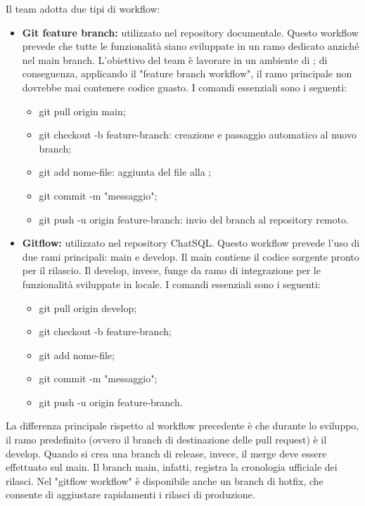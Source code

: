 \par Il team adotta due tipi di workflow:
\begin{itemize}
  \item \textbf{Git feature branch:} utilizzato nel repository documentale. Questo workflow prevede che tutte le funzionalità siano sviluppate in un ramo dedicato anziché nel main branch. L'obiettivo del team è lavorare in un ambiente di ; di conseguenza, applicando il "feature branch workflow", il ramo principale non dovrebbe mai contenere codice guasto. I comandi essenziali sono i seguenti:
  \begin{itemize}
    \item git pull origin main;
    \item git checkout -b feature-branch: creazione e passaggio automatico al nuovo branch;
    \item git add nome-file: aggiunta del file alla ;
    \item git commit -m "messaggio";
    \item git push -u origin feature-branch: invio del branch al repository remoto.
  \end{itemize}
  \item \textbf{Gitflow:} utilizzato nel repository ChatSQL. Questo workflow prevede l'uso di due rami principali: main e develop. Il main contiene il codice sorgente pronto per il rilascio. Il develop, invece, funge da ramo di integrazione per le funzionalità sviluppate in locale. I comandi essenziali sono i seguenti:
  \begin{itemize}
    \item git pull origin develop;
    \item git checkout -b feature-branch;
    \item git add nome-file;
    \item git commit -m "messaggio";
    \item git push -u origin feature-branch.
  \end{itemize}
\end{itemize}
\par La differenza principale rispetto al workflow precedente è che durante lo sviluppo, il ramo predefinito (ovvero il branch di destinazione delle pull request) è il develop. Quando si crea una branch di release, invece, il merge deve essere effettuato sul main. Il branch main, infatti, registra la cronologia ufficiale dei rilasci. Nel "gitflow workflow" è disponibile anche un branch di hotfix, che consente di aggiustare rapidamenti i rilasci di produzione.

